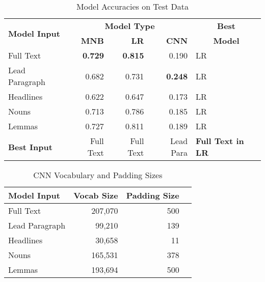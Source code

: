 \documentclass[11pt,a4paper]{article}
\begin{document}
\begin{table}
\centering
\small
\begin{tabular}{|l|rrr|p{1.2cm}|}
	\hline
	\multirow{2}{*}{\textbf{Model Input}} & \multicolumn{3}{c|}{\textbf{Model Type}} & \multicolumn{1}{c|}{\textbf{Best}} \\
	\cline{2-4}
	& \textbf{MNB} & \textbf{LR} & \textbf{CNN} & \multicolumn{1}{c|}{\textbf{Model}} \\
	\hline
	Full Text			& \textbf{0.729}	& \textbf{0.815}	& 0.190		& LR \\
	Lead Paragraph	& 0.682		& 0.731		& \textbf{0.248}	& LR \\
	Headlines			& 0.622		& 0.647		& 0.173		& LR \\
	Nouns			& 0.713		& 0.786		& 0.185		& LR \\
	Lemmas			& 0.727		& 0.811		& 0.189		& LR \\
	\hline
	\textbf{Best Input} & Full Text & Full Text & Lead Para & \textbf{Full Text in LR} \\
	\hline
\end{tabular}
\caption{Model Accuracies on Test Data}
\label{tbl:acc}
\end{table}

\begin{table}
\centering
\small
\begin{tabular}{lrrr}
	\textbf{Model Input} & \textbf{Vocab Size} & \textbf{Padding Size} \\
	\hline
	Full Text			& 207,070	& 500 \\
	Lead Paragraph	& 99,210	& 139 \\
	Headlines			& 30,658	& 11 \\
	Nouns			& 165,531	& 378 \\
	Lemmas			& 193,694	& 500 \\
\end{tabular}
\caption{CNN Vocabulary and Padding Sizes}
\label{tbl:cnn}
\end{table}
\end{document}
